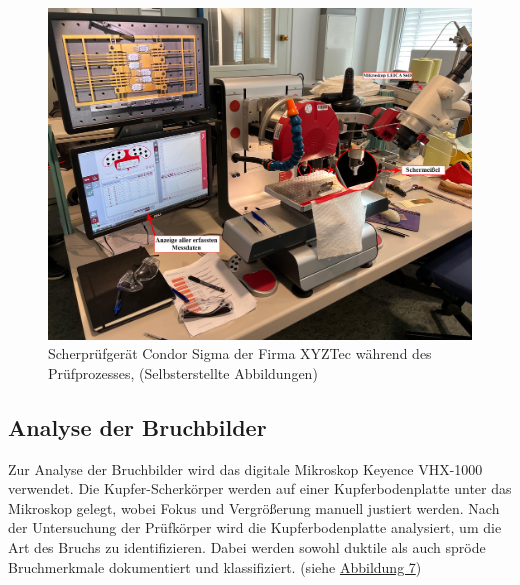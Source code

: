 \begin{figure}[H]
    \centering
    \includegraphics[scale=0.2]{Bilder/WhatsApp Image 2025-03-28 at 17.45.42.jpeg}
    \caption{Scherprüfgerät Condor Sigma der Firma XYZTec während des Prüfprozesses, (Selbsterstellte Abbildungen)}
    \label{CondorSigma}
\end{figure}

\subsection{Analyse der Bruchbilder}
Zur Analyse der Bruchbilder wird das digitale Mikroskop Keyence VHX-1000 verwendet. Die Kupfer-Scherkörper werden auf einer Kupferbodenplatte unter das Mikroskop gelegt, wobei Fokus und Vergrößerung manuell justiert werden. Nach der Untersuchung der Prüfkörper wird die Kupferbodenplatte analysiert, um die Art des Bruchs zu identifizieren. Dabei werden sowohl duktile als auch spröde Bruchmerkmale dokumentiert und klassifiziert. (siehe \hyperref[VHX]{Abbildung 7})


